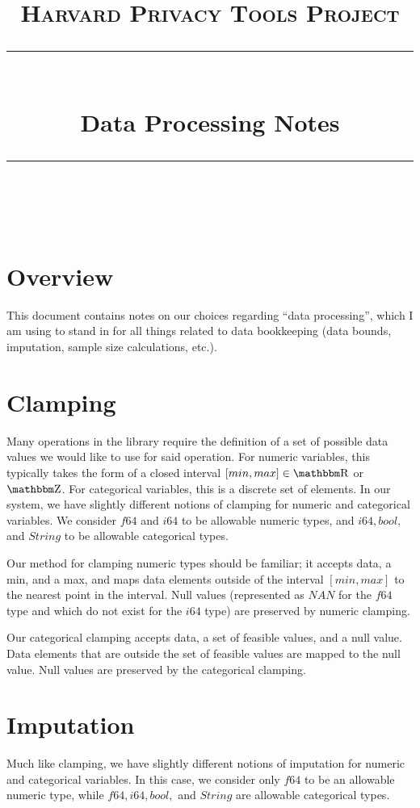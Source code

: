 \documentclass[11pt]{scrartcl} %
\title{
	\normalfont\normalsize
	\textsc{Harvard Privacy Tools Project}\\ %
	\vspace{25pt} %
	\rule{\linewidth}{0.5pt}\\ %
	\vspace{20pt} %
	{\huge Data Processing Notes}\\ %
	\vspace{12pt} %
	\rule{\linewidth}{2pt}\\ %
	\vspace{12pt} %
}
\author{} %
\date{} %
\begin{document}
\maketitle

\tableofcontents

\section{Overview}
This document contains notes on our choices regarding ``data processing'', which I am using to stand in
for all things related to data bookkeeping (data bounds, imputation, sample size calculations, etc.).

\section{Clamping}
Many operations in the library require the definition of a set of possible data values
we would like to use for said operation. For numeric variables, this typically
takes the form of a closed interval $[min, max] \in \R$ or $\Z$. For categorical
variables, this is a discrete set of elements.
In our system, we have slightly different notions of clamping for numeric and categorical variables.
We consider $f64$ and $i64$ to be allowable numeric types, and $i64, bool,$ and $String$ to be
allowable categorical types. \newline

Our method for clamping numeric types should be familiar; it accepts data, a min, and a max,
and maps data elements outside of the interval $[min, max]$ to the nearest point in the interval.
Null values (represented as $NAN$ for the $f64$ type and which do not exist for the $i64$ type)
are preserved by numeric clamping. \newline

Our categorical clamping accepts data, a set of feasible values, and a null value.
Data elements that are outside the set of feasible values are mapped to the null value.
Null values are preserved by the categorical clamping. \newline 


\section{Imputation}
Much like clamping, we have slightly different notions of imputation for numeric and categorical variables.
In this case, we consider only $f64$ to be an allowable numeric type, while
$f64, i64, bool,$ and $String$ are allowable categorical types. \newline
\end{document}
